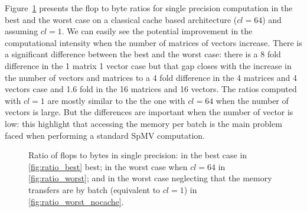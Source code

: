 \documentclass[10pt,conference,compsocconf]{IEEEtran}
\begin{document}
Figure~\ref{fig:ratio_bytes_flops} presents the flop to byte ratios
for single precision computation in the best and the worst case on a
classical cache based architecture ($cl = 64$) and assuming $cl=1$. We
can easily see the potential improvement in the computational
intensity when the number of matrices of vectors increase. There is a
significant difference between the best and the worst case: there is a
$8$ fold difference in the 1 matrix 1 vector case but that gap closes
with the increase in the number of vectors and matrices to a 4 fold
difference in the 4 matrices and 4 vectors case and 1.6 fold in the 16
matrices and 16 vectors. The ratios computed with $cl = 1$ are mostly
similar to the the one with $cl=64$ when the number of vectors is
large. But the differences are important when the number of vector is
low: this highlight that accessing the memory per batch is the main
problem faced when performing a standard SpMV computation.

\begin{figure}
  \centering
  
  \caption{Ratio of flops to bytes in single precision: in the best case in
    \ref{fig:ratio_best} best; in the worst case when $cl=64$ in
    \ref{fig:ratio_worst}; and in the worst case neglecting that the
    memory transfers are by batch (equivalent to $cl = 1$) in
    \ref{fig:ratio_worst_nocache}.}
  \label{fig:ratio_bytes_flops}
\end{figure}
\end{document}
